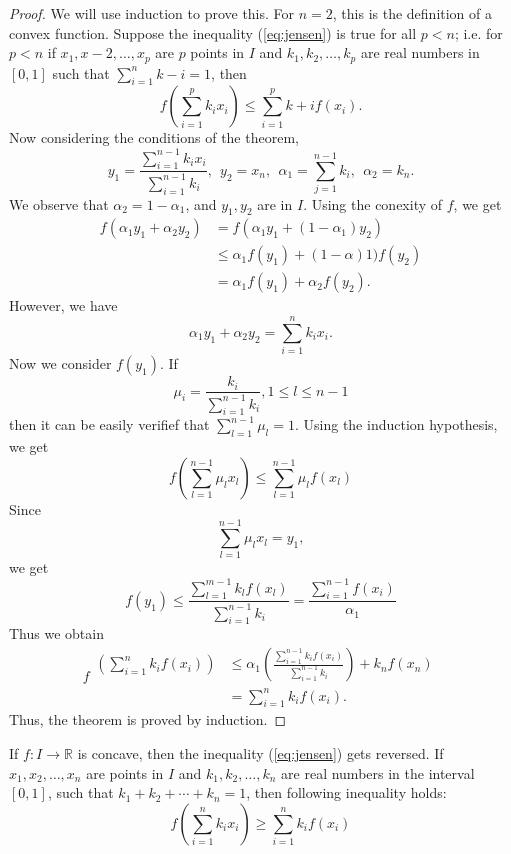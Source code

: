 \begin{proof}
  We will use induction to prove this. For $n = 2$, this is the definition of a convex function. Suppose the inequality
  (\ref{eq:jensen}) is true for all $p<n$; i.e. for $p<n$ if $x_1, x-2, \ldots, x_p$ are $p$ points in $I$ and $k_1, k_2, \ldots,
  k_p$ are real numbers in $[0,1]$ such that $\sum_{i=1}^nk-i = 1$, then
  $$f\left(\sum_{i=1}^pk_ix_i\right)\leq \sum_{i=1}^pk+if(x_i).$$
  Now considering the conditions of the theorem,
  $$y_1 = \frac{\sum_{i=1}^{n-1}k_ix_i}{\sum_{i=1}^{n-1}k_i},~~y_2= x_n,~~\alpha_1 = \sum_{j=1}^{n- 1}k_i,~~\alpha_2 = k_n.$$
  We observe that $\alpha_2 = 1 - \alpha_1$, and $y_1, y_2$ are in $I$. Using the conexity of $f$, we get
  $$\begin{aligned}f(\alpha_1y_1 + \alpha_2y_2)& = f(\alpha_1y_1 + (1 - \alpha_1)y_2)\\& \leq\alpha_1f(y_1) + (1 -
    \alpha)1)f(y_2)\\& = \alpha_1f(y_1) + \alpha_2f(y_2).\end{aligned}$$
  However, we have $$\alpha_1y_1 + \alpha_2y_2 = \sum_{i=1}^nk_ix_i.$$
  Now we consider $f(y_1)$. If $$\mu_i = \frac{k_i}{\sum_{i=1}^{n-1}k_i}, 1\leq l\leq n - 1$$
  then it can be easily verifief that $\sum_{l=1}^{n-1}\mu_l = 1$. Using the induction hypothesis, we get
  $$f\left(\sum_{l=1}^{n-1}\mu_lx_l\right)\leq \sum_{l=1}^{n-1}\mu_lf(x_l)$$
  Since $$\sum_{l=1}^{n-1}\mu_lx_l = y_1,$$
  we get
  $$f(y_1)\leq \frac{\sum_{l=1}^{m-1}k_lf(x_l)}{\sum_{i=1}^{n - 1}k_i} = \frac{\sum_{i=1}^{n-1}f(x_i)}{\alpha_1}$$
  Thus we obtain
  $$f\begin{aligned}\left(\sum_{i=1}^nk_if(x_i)\right)&\leq\alpha_1\left(\frac{\sum_{i=1}^{n-1}k_if(x_i)}{\sum_{i=1}^{n-1}k_i}\right) + k_nf(x_n)\\& = \sum_{i=1}^nk_if(x_i).\end{aligned}$$
  Thus, the theorem is proved by induction.
\end{proof}

\begin{remark}
  If $f:I\rightarrow\mathbb{R}$ is concave, then the inequality (\ref{eq:jensen}) gets reversed. If $x_1, x_2, \ldots, x_n$ are
  points in $I$ and $k_1, k_2, \ldots, k_n$ are real numbers in the interval $[0, 1]$, such that $k_1 + k_2 + \cdots + k_n = 1$,
  then following inequality holds:
  \begin{equation}
    f\left(\sum_{i=1}^nk_ix_i\right)\geq\sum_{i=1}^nk_if(x_i)
  \end{equation}
\end{remark}

